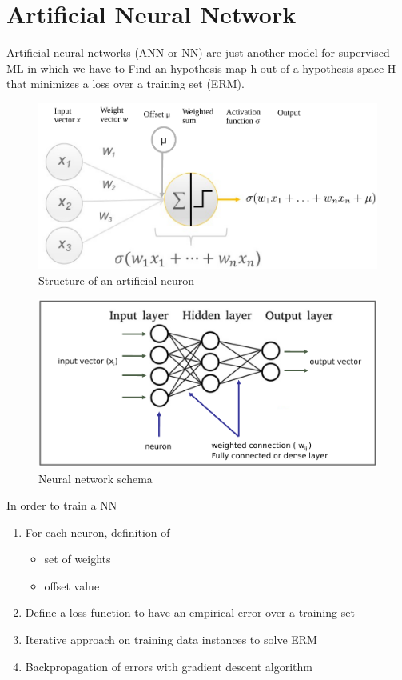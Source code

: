 \chapter{Artificial Neural Network}
Artificial neural networks (ANN or NN) are just another model for supervised ML in which we have to Find an hypothesis map h out of a hypothesis space H that minimizes a loss over a training set (ERM).
\begin{figure}[H]
    \centering
    \includegraphics[scale=0.3]{images/artN/artn1.png}
    \caption{Structure of an artificial neuron}
    \label{fig:enter-label}
\end{figure}

\begin{figure}
    \centering
    \includegraphics[scale=0.3]{images/artN/artn2.png}
    \caption{Neural network schema}
    \label{fig:enter-label}
\end{figure}

In order to train a NN
\begin{enumerate}
    \item For each neuron, definition of
    \begin{itemize}
        \item set of weights
        \item offset value 
    \end{itemize}
    \item  Define a loss function to have an empirical error over a training set
    \item  Iterative approach on training data instances to solve ERM
    \item Backpropagation of errors with gradient descent algorithm
\end{enumerate}

